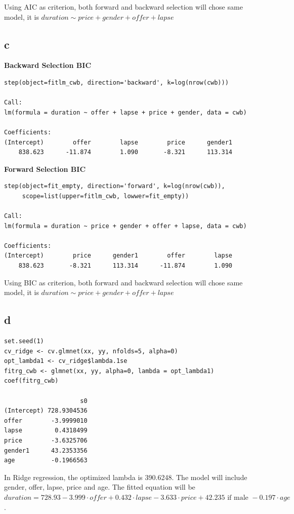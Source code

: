 \documentclass[11pt,letterpaper]{article}
\begin{document}
\noindent Using AIC as criterion, both forward and backward selection will chose same model, it is $duration \sim price + gender + offer + lapse$

\subsection*{c}
\noindent \textbf{Backward Selection BIC}
\begin{verbatim}
step(object=fitlm_cwb, direction='backward', k=log(nrow(cwb)))

Call:
lm(formula = duration ~ offer + lapse + price + gender, data = cwb)

Coefficients:
(Intercept)        offer        lapse        price      gender1  
    838.623      -11.874        1.090       -8.321      113.314  
\end{verbatim}

\noindent \textbf{Forward Selection BIC}
\begin{verbatim}
step(object=fit_empty, direction='forward', k=log(nrow(cwb)),
     scope=list(upper=fitlm_cwb, lowwer=fit_empty))
     
Call:
lm(formula = duration ~ price + gender + offer + lapse, data = cwb)

Coefficients:
(Intercept)        price      gender1        offer        lapse  
    838.623       -8.321      113.314      -11.874        1.090  
\end{verbatim}

\noindent Using BIC as criterion, both forward and backward selection will chose same model, it is $duration \sim price + gender + offer + lapse$

\subsection*{d}
\begin{verbatim}
set.seed(1)
cv_ridge <- cv.glmnet(xx, yy, nfolds=5, alpha=0)
opt_lambda1 <- cv_ridge$lambda.1se
fitrg_cwb <- glmnet(xx, yy, alpha=0, lambda = opt_lambda1)
coef(fitrg_cwb)

                     s0
(Intercept) 728.9304536
offer        -3.9999010
lapse         0.4318499
price        -3.6325706
gender1      43.2353356
age          -0.1966563
\end{verbatim}

\noindent In Ridge regression, the optimized lambda is 390.6248. The model will include gender, offer, lapse, price and age. The fitted equation will be $duration = 728.93 - 3.999 \cdot offer + 0.432 \cdot lapse - 3.633 \cdot price + 42.235 \text{ if male }- 0.197 \cdot age$.
\end{document}
